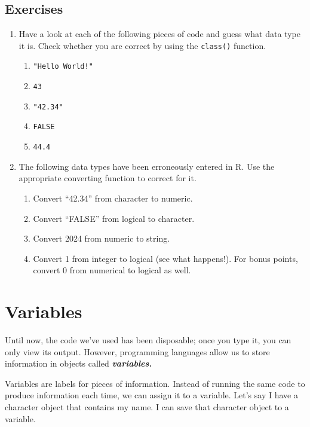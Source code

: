 \documentclass[
]{book}
\providecommand{\tightlist}{%
  \setlength{\itemsep}{0pt}\setlength{\parskip}{0pt}}
\begin{document}
\hypertarget{exercises-1}{%
\subsection{Exercises}\label{exercises-1}}

\begin{enumerate}
\def\labelenumi{\arabic{enumi}.}
\tightlist
\item
  Have a look at each of the following pieces of code and guess what data type it is. Check whether you are correct by using the \texttt{class()} function.

  \begin{enumerate}
  \def\labelenumii{\arabic{enumii}.}
  \tightlist
  \item
    \texttt{"Hello\ World!"}
  \item
    \texttt{43}
  \item
    \texttt{"42.34"}
  \item
    \texttt{FALSE}
  \item
    \texttt{44.4}
  \end{enumerate}
\item
  The following data types have been erroneously entered in R. Use the appropriate converting function to correct for it.

  \begin{enumerate}
  \def\labelenumii{\arabic{enumii}.}
  \tightlist
  \item
    Convert ``42.34'' from character to numeric.
  \item
    Convert ``FALSE'' from logical to character.
  \item
    Convert 2024 from numeric to string.
  \item
    Convert 1 from integer to logical (see what happens!). For bonus points, convert 0 from numerical to logical as well.
  \end{enumerate}
\end{enumerate}

\hypertarget{variables}{%
\section{Variables}\label{variables}}

Until now, the code we've used has been disposable; once you type it, you can only view its output. However, programming languages allow us to store information in objects called \textbf{\emph{variables.}}

Variables are labels for pieces of information. Instead of running the same code to produce information each time, we can assign it to a variable. Let's say I have a character object that contains my name. I can save that character object to a variable.
\end{document}
